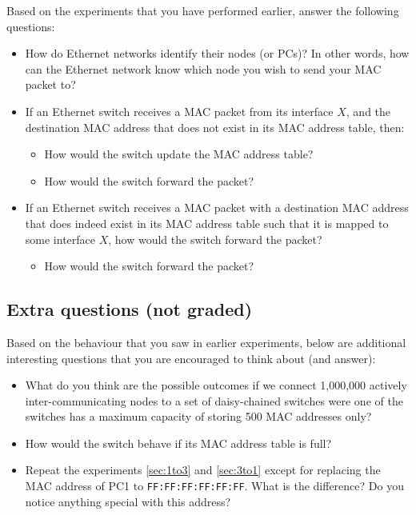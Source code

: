 \documentclass[pdftex,12pt,a4paper]{article}
\begin{document}
            Based on the experiments that you have performed earlier, answer
            the following questions:
            \begin{itemize}
                \item How do Ethernet networks identify their nodes (or PCs)? In
                other words, how can the Ethernet network know which node you
                wish to send your MAC packet to?
                \item If an Ethernet switch receives a MAC packet from its
                interface $X$, and the destination MAC address that does not
                exist in its MAC address table, then:
                    \begin{itemize}
                        \item How would the switch update the MAC address
                        table?
                        \item How would the switch forward the packet?
                    \end{itemize}
                \item If an Ethernet switch receives a MAC packet with a
                destination MAC address that does indeed exist in its MAC address
                table such that it is mapped to some interface $X$, how would
                the switch forward the packet?
                    \begin{itemize}
                        \item How would the switch forward the packet?
                    \end{itemize}
            \end{itemize}

        \subsection{Extra questions (not graded)}
            Based on the behaviour that you saw in earlier experiments, below
            are additional interesting questions that you are encouraged to
            think about (and answer):
            \begin{itemize}
                \item What do you think are the possible outcomes if we connect
                1,000,000 actively inter-communicating nodes to a set of
                daisy-chained switches were one of the switches has a
                maximum capacity of storing 500 MAC addresses only?
                \item How would the switch behave if its MAC address table is
                full?
                \item Repeat the experiments \ref{sec:1to3} and \ref{sec:3to1}
                except for replacing the MAC address of PC1 to
                \texttt{FF:FF:FF:FF:FF:FF}. What is the difference? Do you
                notice anything special with this address?
            \end{itemize}
\end{document}
